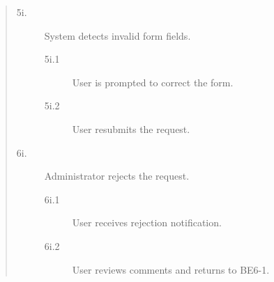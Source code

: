 \documentclass[]{article}
\begin{document}
\begin{enumerate}[{\bf BE7.}]
\begin{quote}
\begin{description}
                        \item[\textmd{5i.}] System detects invalid form fields.
                        \begin{description}
                            \item[\textmd{5i.1}] User is prompted to correct the form.
                            \item[\textmd{5i.2}] User resubmits the request.
                        \end{description}

                        \item[\textmd{6i.}] Administrator rejects the request.
                        \begin{description}
                            \item[\textmd{6i.1}] User receives rejection notification.
                            \item[\textmd{6i.2}] User reviews comments and returns to BE6-1.
                        \end{description}
                    \end{description}
                \end{quote}
\end{enumerate}
\end{document}
